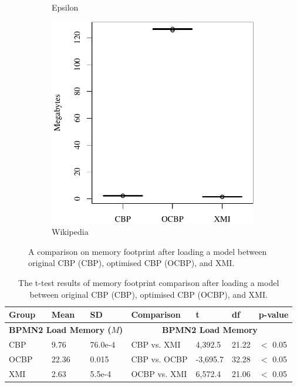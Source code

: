\documentclass{llncs}
\begin{document}
{\begin{figure}[ht]
\begin{subfigure}{0.325\textwidth}
            \caption{Epsilon}
            \label{fig:load_memory_epsilon}
        \end{subfigure}
        \hfill
        \begin{subfigure}{0.325\textwidth}
            \centering
            \includegraphics[width=\linewidth]{images/load_memory_wikipedia}
            \caption{Wikipedia}
            \label{fig:load_memory_wikipedia}
        \end{subfigure}
        \caption{A comparison on memory footprint after loading a model between original CBP (CBP), optimised CBP (OCBP), and XMI.}
        \label{fig:loadmemory}
    \end{figure}

     \begin{table}[t]
        \footnotesize
        \centering
        \caption{The t-test results of memory footprint comparison after loading a model between original CBP (CBP), optimised CBP (OCBP), and XMI.}
        \label{table:ttest_results_load_memory}
        \begin{tabular}
            {|p{}p{}p{}|p{}p{}p{}p{}|}
            \hline 
            
            Group & Mean & SD & Comparison & t  & df & p-value \\
            \hline 
            \multicolumn{3}{|c|}{\textbf{BPMN2 Load Memory ($M$)}} & \multicolumn{4}{c|}{\textbf{BPMN2 Load Memory}} \\
            CBP & 9.76     & 76.0e-4 & CBP vs. XMI &  4,392.5   & 21.22 & $<$ 0.05 \\  
            OCBP & 22.36   & 0.015 & CBP vs. OCBP & -3,695.7 & 32.28  & $<$ 0.05 \\  
            XMI &  2.63   & 5.5e-4 & OCBP vs. XMI &  6,572.4    & 21.06  & $<$ 0.05 \\ 
            \hline 
            

\end{tabular}
\end{table}}
\end{document}
